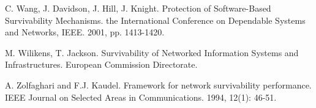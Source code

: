 \documentclass[onecolumn,conference]{IEEEtran}
\begin{document}
\begin{thebibliography}{00}
         C. Wang, J. Davidson, J. Hill, J. Knight. Protection of Software-Based Survivability Mechanisms. the International Conference on Dependable Systems and Networks, IEEE. 2001, pp. 1413-1420.

         M. Wilikens, T. Jackson. Survivability of Networked Information Systems and Infrastructures. European Commission Directorate.

         A. Zolfaghari and F.J. Kaudel. Framework for network survivability performance. IEEE Journal on Selected Areas in Communications. 1994, 12(1): 46-51.

    \end{thebibliography}
\end{document}

